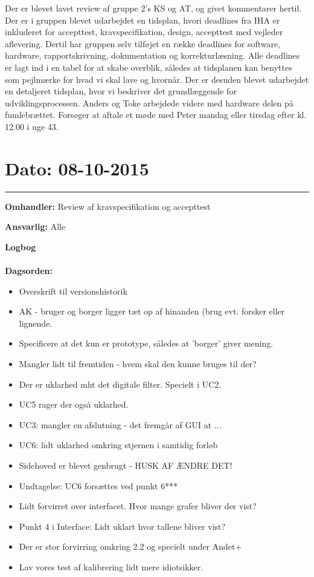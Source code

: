 Der er blevet lavet review af gruppe 2's KS og AT, og givet kommentarer hertil. 
Der er i gruppen blevet udarbejdet en tidsplan, hvori deadlines fra IHA er inkluderet for accepttest, kravspecifikation, design, accepttest med vejleder aflevering. Dertil har gruppen selv tilføjet en række deadlines for software, hardware, rapportskrivning, dokumentation og korrekturlæsning. Alle deadlines er lagt ind i en tabel for at skabe overblik, således at tidsplanen kan benyttes som pejlmærke for hvad vi skal lave og hvornår.
Der er desuden blevet udarbejdet en detaljeret tidsplan, hvor vi beskriver det grundlæggende for udviklingsprocessen.
Anders og Toke arbejdede videre med hardware delen på fumlebrættet.
Forsøger at aftale et møde med Peter mandag eller tirsdag efter kl. 12.00 i uge 43.

	

\section{Dato: 08-10-2015 }
\hrule

\textbf{Omhandler:} Review af kravspecifikation og accepttest 

\textbf{Ansvarlig:} Alle

\textbf{Logbog}
\\
\\
\textbf{Dagsorden:}
\begin{itemize}
	\item Overskrift til versionshistorik
	\item AK - bruger og borger ligger tæt op af hinanden (brug evt. forsker eller lignende.
	\item Specificere at det kun er prototype, således at 'borger' giver mening.
	\item Mangler lidt til fremtiden - hvem skal den kunne bruges til der?
	\item Der er uklarhed mht det digitale filter. Specielt i UC2.
	\item UC5 rager der også uklarhed.
	\item UC3: mangler en afslutning - det fremgår af GUI at ...
	\item UC6: lidt uklarhed omkring stjernen i samtidig forløb
	\item Sidehoved er blevet genbrugt - HUSK AF ÆNDRE DET!
	\item Undtagelse: UC6 forsættes ved punkt 6***
	\item Lidt forvirret over interfacet. Hvor mange grafer bliver der vist? 
	\item Punkt 4 i Interface: Lidt uklart hvor tallene bliver vist?
	\item Der er stor forvirring omkring 2.2 og specielt under Andet+
	\item Lav vores test af kalibrering lidt mere idiotsikker. 
\end{itemize}

